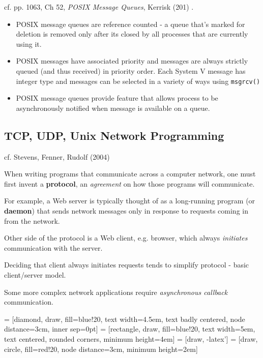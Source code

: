 \documentclass[10pt]{amsart}
\begin{document}
\begin{multicols*}{2}
cf. pp. 1063, Ch 52, \emph{POSIX Message Queues}, Kerrisk (201) \cite{Kerr2010}.

\begin{itemize}
	\item POSIX message queues are reference counted - a queue that's marked for deletion is removed only after its closed by all processes that are currently using it.
	\item POSIX messages have associated priority and messages are always strictly queued (and thus received) in priority order. Each System V message has integer type and messages can be selected in a variety of ways using \verb|msgrcv()|
	\item POSIX message queues provide feature that allows process to be asynchronously notified when message is available on a queue.
\end{itemize}



\subsection{TCP, UDP, Unix Network Programming}

cf. Stevens, Fenner, Rudolf (2004) \cite{SFR2004}

When writing programs that communicate across a computer network, one must first invent a \textbf{protocol}, an \emph{agreement} on how those programs will communicate.

For example, a Web server is typically thought of as a long-running program (or \textbf{daemon}) that sends network messages only in response to requests coming in from the network.

Other side of the protocol is a Web client, e.g. browser, which always \emph{initiates} communication with the server.

Deciding that client always initiates requests tends to simplify protocol - basic client/server model.

Some more complex network applications require \emph{asynchronous callback} communication.


 = [diamond, draw, fill=blue!20, 
text width=4.5em, text badly centered, node distance=3cm, inner sep=0pt]
 = [rectangle, draw, fill=blue!20, 
text width=5em, text centered, rounded corners, minimum height=4em]
 = [draw, -latex']
 = [draw, circle, fill=red!20, node distance=3cm,
minimum height=2em]


\end{multicols*}
\end{document}
